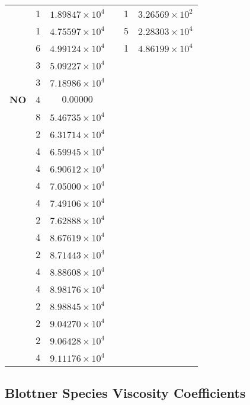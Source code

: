 \begin{table}[htp]
\begin{center}
\begin{tabular}{|l|cc||l|cc|}
   &	   1  & $1.89847\times 10^{4}$   &   &	   1  & $3.26569\times 10^{2}$ \\
   &	   1  & $4.75597\times 10^{4}$    &   &	   5  & $2.28303\times 10^{4}$ \\
   &        6  & $4.99124\times 10^{4}$   &   &	   1  & $4.86199\times 10^{4}$ \\
   &	   3  & $5.09227\times 10^{4}$  &    &        &  \\
   &	   3  & $7.18986\times 10^{4}$ &    &        &   \\ \hline
{\bf NO} &       4  & $0.00000$ &    &        &   \\
   &        8  & $5.46735\times 10^{4}$ &    &        &   \\
   &         2  & $6.31714\times 10^{4}$ &    &        &   \\
   &        4  & $6.59945\times 10^{4}$ &    &        &   \\
   &        4  & $6.90612\times 10^{4}$ &    &        &   \\
   &        4  & $7.05000\times 10^{4}$ &    &        &   \\
   &        4  & $7.49106\times 10^{4}$ &    &        &   \\
   &        2  & $7.62888\times 10^{4}$ &    &        &   \\
   &        4  & $8.67619\times 10^{4}$ &    &        &   \\
   &        2  & $8.71443\times 10^{4}$ &    &        &   \\
   &        4  & $8.88608\times 10^{4}$ &    &        &   \\
   &        4  & $8.98176\times 10^{4}$ &    &        &   \\
   &        2  & $8.98845\times 10^{4}$ &    &        &   \\
   &        2  & $9.04270\times 10^{4}$ &    &        &   \\
   &        2  & $9.06428\times 10^{4}$ &    &        &   \\
   &        4  & $9.11176\times 10^{4}$ &    &        &   \\ \hline
    \end{tabular}
  \end{center}
\end{table}

\clearpage
\subsection{Blottner Species Viscosity Coefficients}

